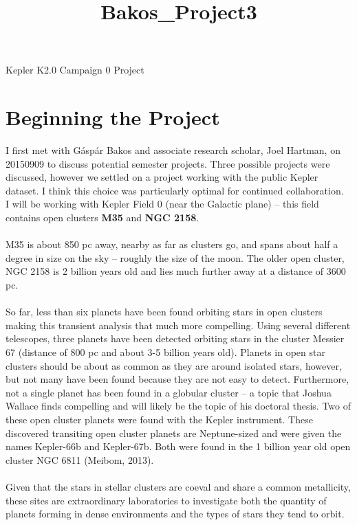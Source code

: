 \documentclass[11pt,letterpaper]{book} %
\begin{document}
\univlogo

\title{Bakos_Project3}

{\Huge Kepler K2.0 Campaign 0 Project}\\[5mm]
\section*{Beginning the Project}
I first met with G\'{a}sp\'{a}r Bakos and associate research scholar, Joel Hartman, on 20150909 to discuss potential semester projects. Three possible projects were discussed, however we settled on a project working with the public Kepler dataset. I think this choice was particularly optimal for continued collaboration.\\
I will be working with Kepler Field 0 (near the Galactic plane) -- this field contains open clusters \textbf{M35} and \textbf{NGC 2158}. \\ \\ 
M35 is about 850 pc away, nearby as far as clusters go, and spans about half a degree in size on the sky -- roughly the size of the moon. 
The older open cluster, NGC 2158 is 2 billion years old and lies much further away at a distance of 3600 pc. \\ \\ 
So far, less than six planets have been found orbiting stars in open clusters making this transient analysis that much more compelling. 
Using several different telescopes, three planets have been detected orbiting stars in the cluster Messier 67 (distance of 800 pc and about 3-5 billion years old). 
Planets in open star clusters should be about as common as they are around isolated stars, however, but not many have been found because they are not easy to detect.
Furthermore, not a single planet has been found in a globular cluster -- a topic that Joshua Wallace finds compelling and will likely be the topic of his doctoral thesis.
Two of these open cluster planets were found with the Kepler instrument. These discovered transiting open cluster planets are Neptune-sized and were given the names Kepler-66b and Kepler-67b. 
Both were found in the 1 billion year old open cluster NGC 6811 (Meibom, 2013).  \\ \\ 
Given that the stars in stellar clusters are coeval and share a common metallicity, these sites are extraordinary laboratories to investigate both the quantity of planets forming in dense environments and the types of stars they tend to orbit.\\ 
\end{document}
